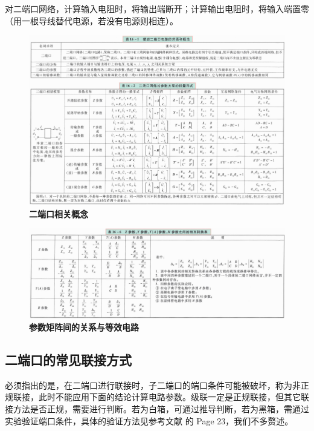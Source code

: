 \documentclass[UTF8]{report}
\theoremstyle{MyLineTheoremStyle} %
\theoremstyle{MyBlockTheoremStyle} %
\theoremstyle{MySubsubsectionStyle} %
\begin{document}
对二端口网络，计算输入电阻时，将输出端断开；计算输出电阻时，将输入端置零（用一根导线替代电源，若没有电源则相连）。

\newpage
\begin{figure}[H]\centering
\includegraphics[width=\textwidth]{assets/1,2/二端口网络.jpg}
\caption{\bfseries 二端口相关概念}\label{二端口相关概念}
\end{figure}

\begin{figure}[H]\centering
\includegraphics[width=\textwidth]{assets/1,2/image (9).jpg}
\caption{\bfseries 参数矩阵间的关系与等效电路}\label{参数矩阵间的关系与等效电路}
\end{figure}

\subsection{二端口的常见联接方式}

必须指出的是，在二端口进行联接时，子二端口的端口条件可能被破坏，称为非正规联接，此时不能应用下面的结论计算电路参数。级联一定是正规联接，但其它联接方法是否正规，需要进行判断。若为白箱，可通过推导判断，若为黑箱，需通过实验验证端口条件，具体的验证方法见参考文献 \cite{电路原理导学导教} 的 Page 23，我们不多赘述。
\end{document}
